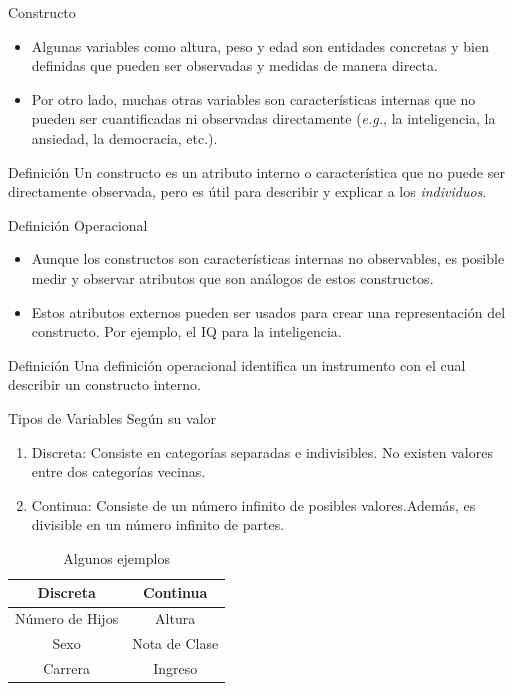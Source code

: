 \documentclass[xcolor=dvipsnames]{beamer}
\begin{document}
\begin{frame}{Constructo}
\begin{itemize}
\justifying
\item Algunas variables como altura, peso y edad son entidades concretas y bien definidas que pueden ser observadas y medidas de manera directa.
\item Por otro lado, muchas otras variables son características internas que no pueden ser cuantificadas ni observadas directamente (\emph{e.g.}, la inteligencia, la ansiedad, la democracia, etc.).
\end{itemize}
\begin{block}{Definición}
\justifying
Un constructo es un atributo interno o característica que no puede ser directamente observada, pero es útil para describir y explicar a los \emph{individuos}.
\end{block}
\end{frame}

\begin{frame}{Definición Operacional}
\begin{itemize}
\justifying
\item Aunque los constructos son características internas no observables, es posible medir y observar atributos que son análogos de estos constructos.
\item Estos atributos externos pueden ser usados para crear una representación del constructo. Por ejemplo, el IQ para la inteligencia.
\end{itemize}
\begin{block}{Definición}
	\justifying
Una definición operacional identifica un instrumento con el cual describir un constructo interno. 
\end{block}
\end{frame}

\begin{frame}{Tipos de Variables}
{\sc Según su valor}
\begin{enumerate}
	\justifying
\item Discreta: Consiste en categorías separadas e indivisibles. No existen valores entre dos categorías vecinas.
\item Continua:  Consiste de un número infinito de posibles valores.Además, es divisible en un número infinito de partes.
\end{enumerate}
\begin{center}
\begin{table}[H]
	\caption{Algunos ejemplos}
\begin{tabular}{|c|c|}\hline
 \bfseries{Discreta} & \bfseries{Continua} \\ \hline
 Número de Hijos & Altura \\ \hline
Sexo & Nota de Clase \\ \hline
Carrera & Ingreso\\ \hline
\end{tabular}
\end{table}
\end{center}
\end{frame}
\end{document}
